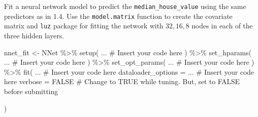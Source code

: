 \documentclass[
  letterpaper,
  DIV=11,
  numbers=noendperiod]{scrartcl}
\newenvironment{Shaded}{\begin{snugshade}}{\end{snugshade}}
\newcommand{\AttributeTok}[1]{\textcolor[rgb]{0.40,0.45,0.13}{#1}}
\newcommand{\CommentTok}[1]{\textcolor[rgb]{0.37,0.37,0.37}{#1}}
\newcommand{\ConstantTok}[1]{\textcolor[rgb]{0.56,0.35,0.01}{#1}}
\newcommand{\FunctionTok}[1]{\textcolor[rgb]{0.28,0.35,0.67}{#1}}
\newcommand{\NormalTok}[1]{\textcolor[rgb]{0.00,0.23,0.31}{#1}}
\newcommand{\OtherTok}[1]{\textcolor[rgb]{0.00,0.23,0.31}{#1}}
\newcommand{\SpecialCharTok}[1]{\textcolor[rgb]{0.37,0.37,0.37}{#1}}
\begin{document}
Fit a neural network model to predict the \texttt{median\_house\_value}
using the same predictors as in 1.4. Use the \texttt{model.matrix}
function to create the covariate matrix and \texttt{luz} package for
fitting the network with \(32, 16, 8\) nodes in each of the three hidden
layers.

\begin{Shaded}
\begin{Highlighting}[]
\NormalTok{nnet\_fit }\OtherTok{\textless{}{-}}\NormalTok{ NNet }\SpecialCharTok{\%\textgreater{}\%} 
  \FunctionTok{setup}\NormalTok{(}
\NormalTok{    ... }\CommentTok{\# Insert your code here}
\NormalTok{  ) }\SpecialCharTok{\%\textgreater{}\%}
  \FunctionTok{set\_hparams}\NormalTok{(}
\NormalTok{    ... }\CommentTok{\# Insert your code here}
\NormalTok{  ) }\SpecialCharTok{\%\textgreater{}\%}
  \FunctionTok{set\_opt\_params}\NormalTok{(}
\NormalTok{    ... }\CommentTok{\# Insert your code here}
\NormalTok{  ) }\SpecialCharTok{\%\textgreater{}\%}
  \FunctionTok{fit}\NormalTok{(}
\NormalTok{    ... }\CommentTok{\# Insert your code here}
    \AttributeTok{dataloader\_options =}\NormalTok{ ... }\CommentTok{\# Insert your code here}
    \AttributeTok{verbose =} \ConstantTok{FALSE} \CommentTok{\# Change to TRUE while tuning. But, set to FALSE before submitting}

\NormalTok{  )}
\end{Highlighting}
\end{Shaded}
\end{document}
